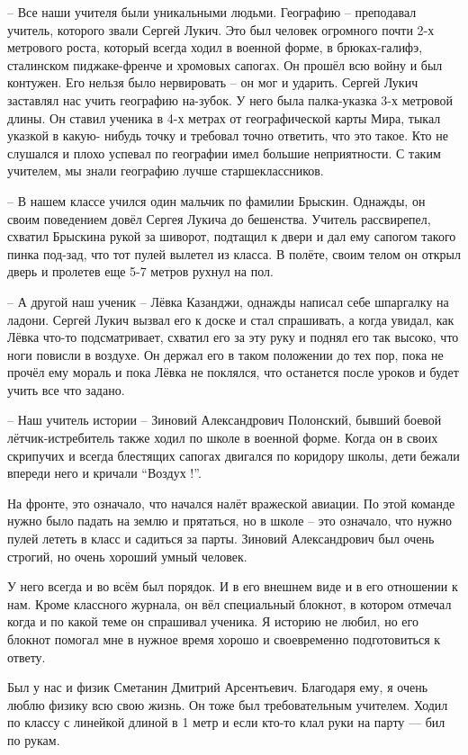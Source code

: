 – Все наши учителя были уникальными людьми. Географию – преподавал учитель,
которого звали Сергей Лукич. Это был человек огромного почти 2-х метрового
роста, который всегда ходил в военной форме, в брюках-галифэ, сталинском
пиджаке-френче и хромовых сапогах. Он прошёл всю войну и был контужен. Его
нельзя было нервировать – он мог и ударить. Сергей Лукич заставлял нас учить
географию на-зубок. У него была палка-указка 3-х метровой длины. Он ставил
ученика в 4-х метрах от географической карты Мира, тыкал указкой в какую-
нибудь точку и требовал точно ответить, что это такое. Кто не слушался и плохо
успевал по географии имел большие неприятности. С таким учителем, мы знали
географию лучше старшеклассников. 

– В нашем классе учился один мальчик по фамилии Брыскин. Однажды, он своим
поведением довёл Сергея Лукича до бешенства. Учитель  рассвирепел, схватил
Брыскина рукой за шиворот, подтащил к двери и дал ему сапогом такого пинка
под-зад, что тот пулей вылетел из класса. В полёте, своим телом он открыл дверь
и пролетев еще 5-7 метров рухнул на пол.

– А другой наш ученик – Лёвка Казанджи, однажды написал себе шпаргалку на
ладони.  Сергей Лукич вызвал его к доске и стал спрашивать, а когда  увидал,
как Лёвка что-то подсматривает, схватил его за эту руку и поднял его так
высоко, что ноги повисли в воздухе. Он держал его в таком положении до тех пор,
пока не прочёл ему мораль и пока Лёвка не поклялся, что останется после уроков
и будет учить все что задано.

– Наш учитель истории – Зиновий Александрович Полонский, бывший боевой
лётчик-истребитель также ходил по школе в военной форме. Когда он в своих
скрипучих и всегда блестящих сапогах двигался по коридору школы, дети бежали
впереди него и кричали “Воздух !”.

На фронте, это означало, что начался налёт вражеской авиации. По этой команде
нужно было падать на землю и прятаться, но в школе – это означало, что нужно
пулей лететь в класс и садиться за парты. Зиновий Александрович был очень
строгий, но очень хороший умный человек.

У него всегда и во всём был порядок. И в его внешнем виде и в его отношении к
нам. Кроме классного журнала, он вёл специальный блокнот, в котором отмечал
когда и по какой теме он спрашивал ученика. Я историю не любил, но его блокнот
помогал мне в нужное время хорошо и своевременно подготовиться к ответу. 

Был у нас и физик  Сметанин Дмитрий Арсентьевич. Благодаря ему, я очень люблю
физику всю свою жизнь. Он тоже был требовательным учителем. Ходил по классу с
линейкой длиной в 1 метр и если кто-то клал руки на парту — бил по рукам.

